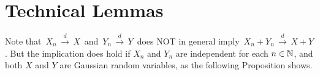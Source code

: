  

\section{Technical Lemmas}
\setcounter{theorem}{0}
\setcounter{equation}{0}

\renewcommand{\theenumi}{\roman{enumi}}
\renewcommand{\labelenumi}{\textnormal{(\theenumi)}$\;\;$}

Note that
\,$X_{n}\,\overset{d}{\longrightarrow}\,X$\,
and
\,$Y_{n}\,\overset{d}{\longrightarrow}\,Y$\,
does NOT in general imply
\,$X_{n} + Y_{n}\,\overset{d}{\longrightarrow}\,X + Y$.
But the implication does hold if $X_{n}$ and $Y_{n}$
are independent for each $n \in \mathbb{N}$, and 
both $X$ and $Y$ are Gaussian random variables,
as the following Proposition shows.

